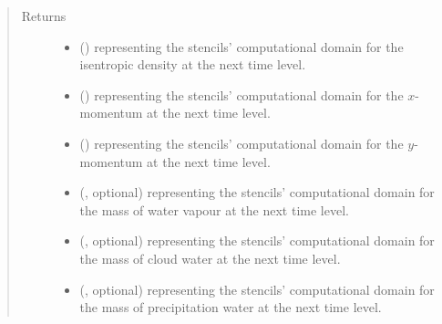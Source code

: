 \documentclass[letterpaper,10pt,english]{sphinxmanual}
\begin{document}
\begin{fulllineitems}
\begin{fulllineitems}
\begin{quote}
\begin{description}
\begin{itemize}
\end{itemize}

\item[{Returns}] \leavevmode
\begin{itemize}
\item {} 
 () \textendash{}  representing the stencils’ computational domain for the isentropic density
at the next time level.

\item {} 
 () \textendash{}  representing the stencils’ computational domain for the \(x\)-momentum
at the next time level.

\item {} 
 () \textendash{}  representing the stencils’ computational domain for the \(y\)-momentum
at the next time level.

\item {} 
 (, optional) \textendash{}  representing the stencils’ computational domain for the mass of water vapour
at the next time level.

\item {} 
 (, optional) \textendash{}  representing the stencils’ computational domain for the mass of cloud water
at the next time level.

\item {} 
 (, optional) \textendash{}  representing the stencils’ computational domain for the mass of precipitation water
at the next time level.

\end{itemize}


\end{description}\end{quote}

\end{fulllineitems}


\end{fulllineitems}
\end{document}
